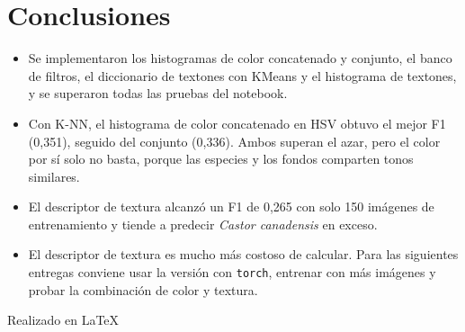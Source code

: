 \documentclass[11pt]{article}
\begin{document}
\section{Conclusiones}

\begin{itemize}
  \item Se implementaron los histogramas de color concatenado y conjunto, el banco de filtros, el diccionario de textones con KMeans y el histograma de textones, y se superaron todas las pruebas del notebook.
  \item Con K-NN, el histograma de color concatenado en HSV obtuvo el mejor F1 (0,351), seguido del conjunto (0,336). Ambos superan el azar, pero el color por sí solo no basta, porque las especies y los fondos comparten tonos similares.
  \item El descriptor de textura alcanzó un F1 de 0,265 con solo 150 imágenes de entrenamiento y tiende a predecir \emph{Castor canadensis} en exceso.
  \item El descriptor de textura es mucho más costoso de calcular. Para las siguientes entregas conviene usar la versión con \texttt{torch}, entrenar con más imágenes y probar la combinación de color y textura.
\end{itemize}

\begin{flushright}
\small Realizado en \LaTeX
\end{flushright}
\end{document}
